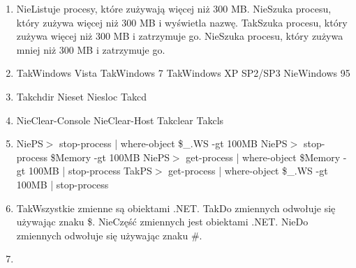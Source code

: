 \begin{enumerate}
		{Nie}{Get-Childitem | Where-Object ( \$\_.length $>$ 2kB ) | Remove-Item}%
		{Nie}{Get-Childitem | Remove-Item | Where ( \$\_.length $>$ 2kB )}%
		{Tak}{Get-Childitem | Where-Object ( \$\_.length -gt 2kB ) | Remove-Item}%
		{Tak}{ls | where-object \{ \$\_.length -gt 2kB \} | rm}
		\item {}%
		{Nie}{Listuje procesy, które zużywają więcej niż 300 MB.}%
		{Nie}{Szuka procesu, który zużywa więcej niż 300 MB i wyświetla nazwę.}%
		{Tak}{Szuka procesu, który zużywa więcej niż 300 MB i zatrzymuje go.}%
		{Nie}{Szuka procesu, który zużywa mniej niż 300 MB i zatrzymuje go.}
		\item {}%
		{Tak}{Windows Vista}%
		{Tak}{Windows 7}%
		{Tak}{Windows XP SP2/SP3}%
		{Nie}{Windows 95}
		\item {}%
		{Tak}{chdir}%
		{Nie}{set}%
		{Nie}{sloc}%
		{Tak}{cd}
		\newpage
		\item {}%
		{Nie}{Clear-Console}%
		{Nie}{Clear-Host}%
		{Tak}{clear}%
		{Tak}{cls}
		\item {}%
		{Nie}{PS$ > $ stop-process | where-object { \$\_.WS -gt 100MB }}%
		{Nie}{PS$ > $ stop-process \$Memory -gt 100MB}%
		{Nie}{PS$ > $ get-process | where-object { \$Memory -gt 100MB } | stop-process}%
		{Tak}{PS$ > $ get-process | where-object { \$\_.WS -gt 100MB } | stop-process}
		\item {}%
		{Tak}{Wszystkie zmienne są obiektami .NET.}%
		{Tak}{Do zmiennych odwołuje się używając znaku \$.}%
		{Nie}{Część zmiennych jest obiektami .NET.}%
		{Nie}{Do zmiennych odwołuje się używając znaku \#.}
		\item {}%

\end{enumerate}
